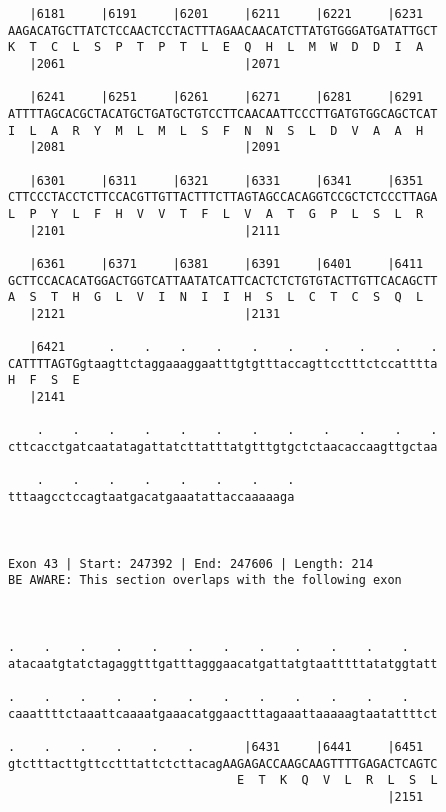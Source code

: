 \documentclass{article}
\begin{document}
\begin{Verbatim}
   |6181     |6191     |6201     |6211     |6221     |6231  
AAGACATGCTTATCTCCAACTCCTACTTTAGAACAACATCTTATGTGGGATGATATTGCT
K  T  C  L  S  P  T  P  T  L  E  Q  H  L  M  W  D  D  I  A  
   |2061                         |2071                      
  
   |6241     |6251     |6261     |6271     |6281     |6291  
ATTTTAGCACGCTACATGCTGATGCTGTCCTTCAACAATTCCCTTGATGTGGCAGCTCAT
I  L  A  R  Y  M  L  M  L  S  F  N  N  S  L  D  V  A  A  H  
   |2081                         |2091                      
  
   |6301     |6311     |6321     |6331     |6341     |6351  
CTTCCCTACCTCTTCCACGTTGTTACTTTCTTAGTAGCCACAGGTCCGCTCTCCCTTAGA
L  P  Y  L  F  H  V  V  T  F  L  V  A  T  G  P  L  S  L  R  
   |2101                         |2111                      
  
   |6361     |6371     |6381     |6391     |6401     |6411  
GCTTCCACACATGGACTGGTCATTAATATCATTCACTCTCTGTGTACTTGTTCACAGCTT
A  S  T  H  G  L  V  I  N  I  I  H  S  L  C  T  C  S  Q  L  
   |2121                         |2131                      
  
   |6421      .    .    .    .    .    .    .    .    .    .
CATTTTAGTGgtaagttctaggaaaggaatttgtgtttaccagttcctttctccatttta
H  F  S  E                                                  
   |2141                                                    
  
    .    .    .    .    .    .    .    .    .    .    .    .
cttcacctgatcaatatagattatcttatttatgtttgtgctctaacaccaagttgctaa
                                                            
    .    .    .    .    .    .    .    .
tttaagcctccagtaatgacatgaaatattaccaaaaaga
                                        
                                        
 
Exon 43 | Start: 247392 | End: 247606 | Length: 214
BE AWARE: This section overlaps with the following exon



.    .    .    .    .    .    .    .    .    .    .    .    
atacaatgtatctagaggtttgatttagggaacatgattatgtaatttttatatggtatt
                                                            
.    .    .    .    .    .    .    .    .    .    .    .    
caaattttctaaattcaaaatgaaacatggaactttagaaattaaaaagtaatattttct
                                                            
.    .    .    .    .    .       |6431     |6441     |6451  
gtctttacttgttcctttattctcttacagAAGAGACCAAGCAAGTTTTGAGACTCAGTC
                                E  T  K  Q  V  L  R  L  S  L
                                                     |2151  
  

\end{Verbatim}
\end{document}
